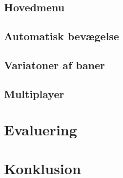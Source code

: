 \documentclass{report}
\begin{document}
\subsection{Hovedmenu}


\subsection{Automatisk bevægelse}

\subsection{Variatoner af baner}

\subsection{Multiplayer}

\section{Evaluering}

\section{Konklusion}
\end{document}
